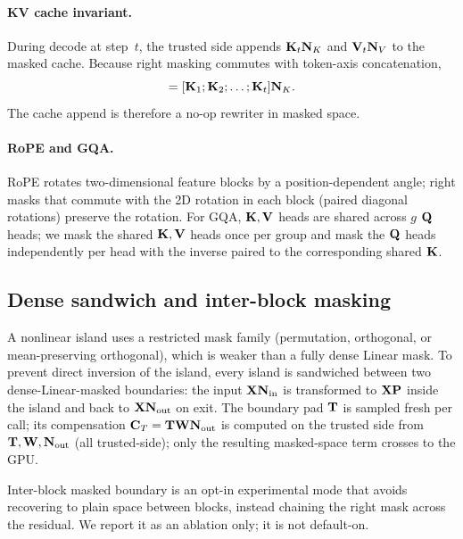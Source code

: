 \paragraph{KV cache invariant.} During decode at step~$t$, the trusted side appends $\mathbf{K}_t\mathbf{N}_{K}$ and $\mathbf{V}_t\mathbf{N}_{V}$ to the masked cache. Because right masking commutes with token-axis concatenation,
\begin{equation}
[\K_1\NK; \K_2\NK; \ldots; \K_t\NK] = [\K_1; \K_2; \ldots; \K_t]\NK.
\end{equation}
The cache append is therefore a no-op rewriter in masked space.

\paragraph{RoPE and GQA.} RoPE rotates two-dimensional feature blocks by a position-dependent angle; right masks that commute with the 2D rotation in each block (paired diagonal rotations) preserve the rotation. For GQA, $\mathbf{K}, \mathbf{V}$ heads are shared across $g$ $\mathbf{Q}$ heads; we mask the shared $\mathbf{K}, \mathbf{V}$ heads once per group and mask the $\mathbf{Q}$ heads independently per head with the inverse paired to the corresponding shared $\mathbf{K}$.

\subsection{Dense sandwich and inter-block masking}
\label{sec:design:sandwich}
A nonlinear island uses a restricted mask family (permutation, orthogonal, or mean-preserving orthogonal), which is weaker than a fully dense Linear mask. To prevent direct inversion of the island, every island is sandwiched between two dense-Linear-masked boundaries: the input $\mathbf{X}\mathbf{N}_{\mathrm{in}}$ is transformed to $\mathbf{X}\mathbf{P}$ inside the island and back to $\mathbf{X}\mathbf{N}_{\mathrm{out}}$ on exit. The boundary pad $\mathbf{T}$ is sampled fresh per call; its compensation $\mathbf{C}_{T} = \mathbf{T}\mathbf{W}\mathbf{N}_{\mathrm{out}}$ is computed on the trusted side from $\mathbf{T}, \mathbf{W}, \mathbf{N}_{\mathrm{out}}$ (all trusted-side); only the resulting masked-space term crosses to the GPU.

Inter-block masked boundary is an opt-in experimental mode that avoids recovering to plain space between blocks, instead chaining the right mask across the residual. We report it as an ablation only; it is not default-on.

